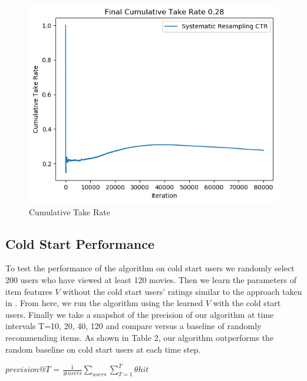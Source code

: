 \documentclass{article}
\begin{document}
\begin{figure}[ht]
\begin{center}
\centerline{\includegraphics[width=\columnwidth]{CTR}}
\caption{Cumulative Take Rate}
\label{MSEResampling}
\end{center}
\vskip -0.4in
\end{figure}


\subsection{Cold Start Performance}
To test the performance of the algorithm on cold start users we randomly select 200 users who have viewed at least 120 movies. Then we learn the parameters of item features $V$ without the cold start users’ ratings similar to the approach taken in \cite{zhao2013interactive}. From here, we run the algorithm using the learned $V$ with the cold start users. Finally we take a snapshot of the precision of our algorithm at time intervals T=10, 20, 40, 120 and compare versus a baseline of randomly recommending items. As shown in Table 2, our algorithm outperforms the random baseline on cold start users at each time step.

\begin{center}
$precision@T$ = $\frac{1}{\#users}\sum\limits_{users}\sum\limits_{T=1}^{T}\theta hit$
\end{center}
\end{document}
